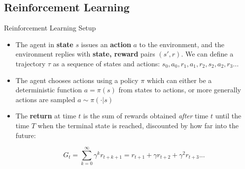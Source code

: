 \documentclass[8pt]{beamer}
\begin{document}
\subsection{Reinforcement Learning}

\begin{frame}{Reinforcement Learning Setup}
\begin{itemize}
    \item The agent in \textbf{state} $s$ issues an \textbf{action} $a$ to the environment, and the environment replies with \textbf{state, reward} pairs $(s',r)$. We can define a trajectory $\tau$ as a sequence of states and actions: $s_0, a_0, r_1, a_1, r_2, s_2, a_2, r_3...$
    \item The agent chooses actions using a policy $\pi$ which can either be a deterministic function $a=\pi(s)$ from states to actions, or more generally actions are sampled $a \sim \pi(\cdot|s)$
    \item The \textbf{return} at time $t$ is the sum of rewards obtained \textit{after} time $t$ until the time $T$ when the terminal state is reached, discounted by how far into the future:

    \begin{equation}
        G_t = \sum_{k=0}^{\infty} \gamma^k r_{t+k+1} = r_{t+1} + \gamma r_{t+2} + \gamma^2 r_{t+3} ...
    \end{equation}

\end{itemize}
\end{frame}
\end{document}
